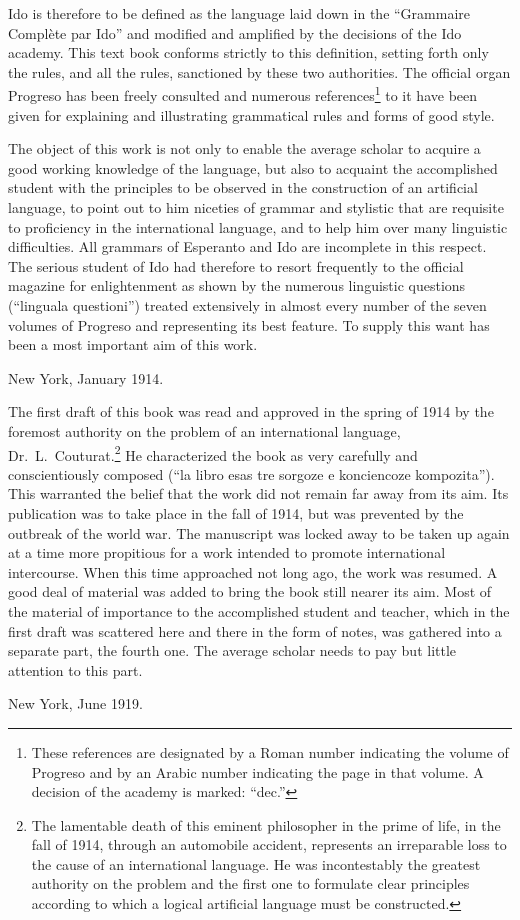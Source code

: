 Ido is therefore to be defined as the language laid down in the “Grammaire Complète par Ido” and modified and amplified by the decisions of the Ido academy. This text book conforms strictly to this definition, setting forth only the rules, and all the rules, sanctioned by these two authorities. The official organ Progreso has been freely consulted and numerous references\footnote{These references are designated by a Roman number indicating the volume of Progreso and by an Arabic number indicating the page in that volume. A decision of the academy is marked: ``dec.''} to it have been given for explaining and illustrating grammatical rules and forms of good style. 

The object of this work is not only to enable the average scholar to acquire a good working knowledge of the language, but also to acquaint the accomplished student with the principles to be observed in the construction of an artificial language, to point out to him niceties of grammar and stylistic that are requisite to proficiency in the international language, and to help him over many linguistic difficulties. All grammars of Esperanto and Ido are incomplete in this respect. The serious student of Ido had therefore to resort frequently to the official magazine for enlightenment as shown by the numerous linguistic questions (“linguala questioni”) treated extensively in almost every number of the seven volumes of Progreso and representing its best feature. To supply this want has been a most important aim of this work. \begin{flushright}New York, January 1914.\end{flushright}

The first draft of this book was read and approved in the spring of 1914 by the foremost authority on the problem of an international language, Dr.~L.~Couturat.\footnote{The lamentable death of this eminent philosopher in the prime of life, in the fall of 1914, through an automobile accident, represents an irreparable loss to the cause of an international language. He was incontestably the greatest authority on the problem and the first one to formulate clear principles according to which a logical artificial language must be constructed.} He characterized the book as very carefully and conscientiously composed (“la libro esas tre sorgoze e konciencoze kompozita”). This warranted the belief that the work did not remain far away from its aim. Its publication was to take place in the fall of 1914, but was prevented by the outbreak of the world war. The manuscript was locked away to be taken up again at a time more propitious for a work intended to promote international intercourse. When this time approached not long ago, the work was resumed. A good deal of material was added to bring the book still nearer its aim. Most of the material of importance to the accomplished student and teacher, which in the first draft was scattered here and there in the form of notes, was gathered into a separate part, the fourth one. The average scholar needs to pay but little attention to this part. 
\begin{flushright}New York, June 1919.\end{flushright}

